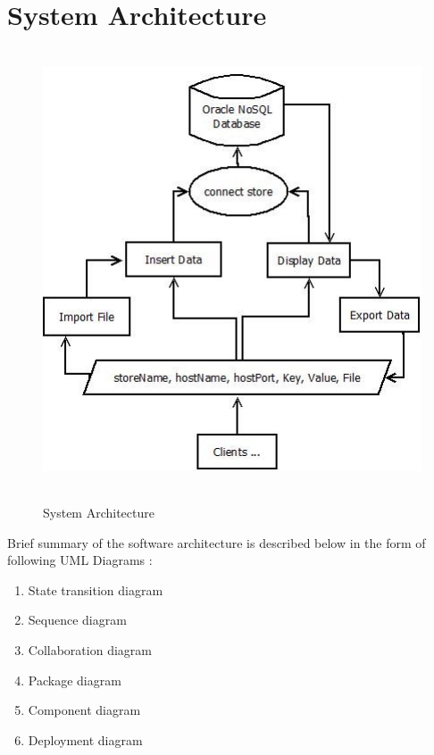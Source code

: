 \section{System Architecture}

\begin{figure}[h]
\centering
  \includegraphics[width=14cm,height=13cm]{Fig10.jpg}\\
  \caption{System Architecture} \label{System Architecture}
\end{figure}

Brief summary of the software architecture is described below in the form of following UML Diagrams :
\begin{enumerate}
  \item State transition diagram
  \item Sequence diagram
  \item Collaboration diagram
  \item Package diagram
  \item Component diagram
  \item Deployment diagram
\end{enumerate}

